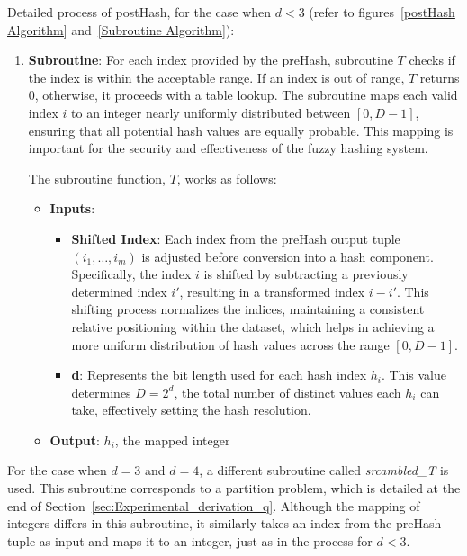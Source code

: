 Detailed process of postHash, for the case when $d < 3$ (refer to figures~\ref{postHash Algorithm} and~\ref{Subroutine Algorithm}):
\begin{enumerate}
    \item \textbf{Subroutine}: For each index provided by the preHash, subroutine \(T\) checks if the index is within the acceptable range. If an index is out of range, \(T\) returns 0, otherwise, it proceeds with a table lookup. The subroutine maps each valid index \(i\) to an integer nearly uniformly distributed between \([0, D-1]\), ensuring that all potential hash values are equally probable. This mapping is important for the security and effectiveness of the fuzzy hashing system.
    
    The subroutine function, \(T\), works as follows:
    \begin{itemize}
        \item \textbf{Inputs}: 
        \begin{itemize}
            \item \textbf{Shifted Index}: Each index from the preHash output tuple \((i_1, \ldots, i_m)\) is adjusted before conversion into a hash component. Specifically, the index \(i\) is shifted by subtracting a previously determined index \(i'\), resulting in a transformed index \(i - i'\). This shifting process normalizes the indices, maintaining a consistent relative positioning within the dataset, which helps in achieving a more uniform distribution of hash values across the range \([0, D-1]\).
            \item \textbf{d}: Represents the bit length used for each hash index \(h_i\). This value determines \(D = 2^d\), the total number of distinct values each \(h_i\) can take, effectively setting the hash resolution.
        \end{itemize}
        \item \textbf{Output}: \(h_i\), the mapped integer
    \end{itemize}
\end{enumerate}

For the case when $d = 3$ and $d = 4$, a different subroutine called \textit{srcambled\_T} is used. This subroutine corresponds to a partition problem, which is detailed at the end of Section~\ref{sec:Experimental_derivation_q}. Although the mapping of integers differs in this subroutine, it similarly takes an index from the preHash tuple as input and maps it to an integer, just as in the process for $d < 3$.

\vspace{20pt}

